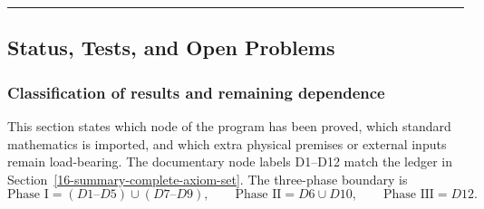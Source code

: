 \begin{center}\rule{0.5\linewidth}{0.5pt}\end{center}
\subsection{Status, Tests, and Open Problems}\label{8-status-tests-and-open-problems}

\subsubsection{Classification of results and remaining dependence}\label{81-classification-of-results}

This section states which node of the program has been proved, which standard mathematics is imported, and which extra physical premises or external inputs remain load-bearing. The documentary node labels D1--D12 match the ledger in Section~\ref{16-summary-complete-axiom-set}. The three-phase boundary is
\[
\text{Phase I}=(D1\text{--}D5)\cup(D7\text{--}D9),\qquad
\text{Phase II}=D6\cup D10,\qquad
\text{Phase III}=D12.
\]

